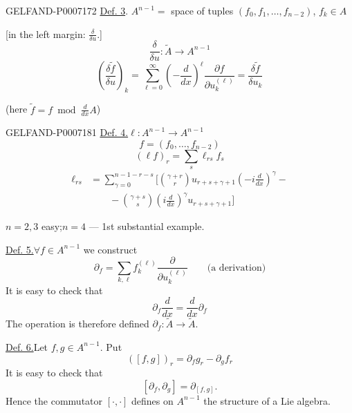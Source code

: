 \par\endgroup
\begin{GelfandAdjacentEvidence}{GELFAND-P000717}{2}
\underline{Def. 3}. \quad
\(A^{n-1}={}\) space of tuples \((f_0,f_1,\ldots,f_{n-2})\), \(f_k\in A\)

[in the left margin: \(\frac{\delta}{\delta u}\).]
\[
\frac{\delta}{\delta u}:\widetilde A\longrightarrow A^{n-1}
\]
\[
\left(\frac{\delta\widetilde f}{\delta u}\right)_k
=\sum_{\ell=0}^{\infty}\left(-\frac{d}{dx}\right)^\ell
\frac{\partial f}{\partial u_k^{(\ell)}}
=\frac{\delta\widetilde f}{\delta u_k}
\]
\end{GelfandAdjacentEvidence}

(here \(\widetilde f=f\bmod\frac{d}{dx}A\))


\begin{GelfandAdjacentEvidence}{GELFAND-P000718}{1}
\underline{Def. 4.}\quad \(\ell:A^{n-1}\longrightarrow A^{n-1}\)
\[
f=(f_0,\ldots,f_{n-2})
\]
\[
(\ell f)_r=\sum_s\ell_{rs}f_s
\]
\[
\begin{aligned}
\ell_{rs}&=\sum_{\gamma=0}^{n-1-r-s}
\Biggl[\binom{\gamma+r}{r}u_{r+s+\gamma+1}
\left(-i\frac{d}{dx}\right)^\gamma-\\
&\qquad-\binom{\gamma+s}{s}\left(i\frac{d}{dx}\right)^\gamma
u_{r+s+\gamma+1}\Biggr]
\end{aligned}
\]
\end{GelfandAdjacentEvidence}
\par\begingroup\setlength{\parindent}{0pt}\setlength{\parskip}{.4em}\raggedright


\underline{\(n=2,3\)} easy;\qquad \underline{\(n=4\)} --- 1st substantial example.

\underline{Def. 5.}\quad \(\forall f\in A^{n-1}\) we construct
\[
\partial_f=\sum_{k,\ell}f_k^{(\ell)}\frac{\partial}{\partial u_k^{(\ell)}}
\qquad\text{(a derivation)}
\]
It is easy to check that
\[
\partial_f\frac{d}{dx}=\frac{d}{dx}\partial_f
\]
The operation is therefore defined \(\partial_f:\widetilde A\longrightarrow\widetilde A\).

\underline{Def. 6.}\quad Let \(f,g\in A^{n-1}\). Put
\[
([f,g])_r=\partial_f g_r-\partial_g f_r
\]
It is easy to check that
\[
[\partial_f,\partial_g]=\partial_{[f,g]}.
\]
Hence the commutator \([\cdot,\cdot]\) defines on \(A^{n-1}\) the structure of a Lie algebra.

